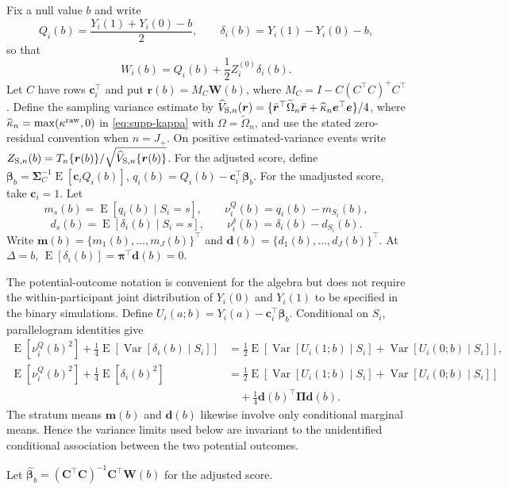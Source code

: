 \documentclass[12pt,a4paper]{article}
\theoremstyle{definition}
\theoremstyle{remark}\newtheorem{remark}{Remark}
\numberwithin{equation}{section}
\newcommand{\E}{\operatorname{E}}
\newcommand{\Var}{\operatorname{Var}}
\begin{document}
Fix a null value $b$ and write
\begin{equation}\label{eq:supp-Qdelta}
Q_i(b)=\frac{Y_i(1)+Y_i(0)-b}{2},
\qquad
\delta_i(b)=Y_i(1)-Y_i(0)-b,
\end{equation}
so that
\begin{equation}\label{eq:supp-Widentity-general}
W_i(b)=Q_i(b)+\frac12Z_i^{(0)}\delta_i(b).
\end{equation}
Let $C$ have rows $\bm c_i^\top$ and put $\bm r(b)=M_C\bm W(b)$, where $M_C=I-C(C^\top C)^+C^\top$. Define the sampling variance estimate by $\widehat V_{{\rm S},n}(\bm r)=\{\bar{\bm r}^\top\widetilde\Omega_n\bar{\bm r}+\widehat\kappa_n\bm e^\top\bm e\}/4$, where $\widehat\kappa_n=\max(\kappa^{\rm raw},0)$ in \eqref{eq:supp-kappa} with $\Omega=\widetilde\Omega_n$, and use the stated zero-residual convention when $n=J_+$. On positive estimated-variance events write $Z_{{\rm S},n}(b)=T_n\{\bm r(b)\}/\sqrt{\widehat V_{{\rm S},n}\{\bm r(b)\}}$. For the adjusted score, define $\bm\beta_b=\bm\Sigma_C^{-1}\E[\bm c_iQ_i(b)]$, $q_i(b)=Q_i(b)-\bm c_i^\top\bm\beta_b$. For the unadjusted score, take $\bm c_i=1$. Let
\[
m_s(b)=\E[q_i(b)\mid S_i=s],
\qquad
\nu_i^Q(b)=q_i(b)-m_{S_i}(b),
\]
\[
d_s(b)=\E[\delta_i(b)\mid S_i=s],
\qquad
\nu_i^\delta(b)=\delta_i(b)-d_{S_i}(b).
\]
Write $\bm m(b)=\{m_1(b),\ldots,m_J(b)\}^\top$ and $\bm d(b)=\{d_1(b),\ldots,d_J(b)\}^\top$. At $\Delta=b$, $\E[\delta_i(b)]=\bm\pi^\top\bm d(b)=0$.

The potential-outcome notation is convenient for the algebra but does
not require the within-participant joint distribution of $Y_i(0)$ and
$Y_i(1)$ to be specified in the binary simulations. Define
$U_i(a;b)=Y_i(a)-\bm c_i^\top\bm\beta_b$. Conditional on $S_i$,
parallelogram identities give
\begin{align}
\E[\nu_i^Q(b)^2]
+\frac14\E[\Var[\delta_i(b)\mid S_i]]
&=
\frac12\E\left[
\Var[U_i(1;b)\mid S_i]
+\Var[U_i(0;b)\mid S_i]
\right],
\label{eq:supp-coupling-R}\\
\E[\nu_i^Q(b)^2]
+\frac14\E[\delta_i(b)^2]
&=
\frac12\E\left[
\Var[U_i(1;b)\mid S_i]
+\Var[U_i(0;b)\mid S_i]
\right]
\nonumber\\
&\quad+\frac14\bm d(b)^\top\bm\Pi\bm d(b).
\label{eq:supp-coupling-S}
\end{align}
The stratum means $\bm m(b)$ and $\bm d(b)$ likewise involve only
conditional marginal means. Hence the variance limits used below are
invariant to the unidentified conditional association between the two
potential outcomes.

Let $\widehat{\bm\beta}_b=(\bm C^\top\bm C)^{-1}\bm C^\top\bm W(b)$ for the adjusted score.
\end{document}
